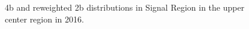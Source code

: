\begin{figure}[ht]
 
 
    \caption{4b and reweighted 2b distributions in Signal Region in the upper center region in 2016.}
    \label{fig:upper-center-4b-SR-2016}
\end{figure}



